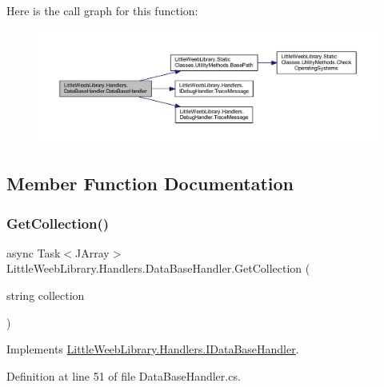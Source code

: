 Here is the call graph for this function\+:\nopagebreak
\begin{figure}[H]
\begin{center}
\leavevmode
\includegraphics[width=350pt]{class_little_weeb_library_1_1_handlers_1_1_data_base_handler_af3623e6075f8aaf6f5082994cd1448df_cgraph}
\end{center}
\end{figure}


\subsection{Member Function Documentation}
\mbox{\label{class_little_weeb_library_1_1_handlers_1_1_data_base_handler_ae04312874502a18b241c1123ef963b90}} 
\subsubsection{\texorpdfstring{Get\+Collection()}{GetCollection()}}
{\footnotesize\ttfamily async Task$<$J\+Array$>$ Little\+Weeb\+Library.\+Handlers.\+Data\+Base\+Handler.\+Get\+Collection (\begin{DoxyParamCaption}\item[{string}]{collection }\end{DoxyParamCaption})}



Implements \mbox{\hyperlink{interface_little_weeb_library_1_1_handlers_1_1_i_data_base_handler_a33ee83202d229f44d3839af7c1b65df0}{Little\+Weeb\+Library.\+Handlers.\+I\+Data\+Base\+Handler}}.



Definition at line 51 of file Data\+Base\+Handler.\+cs.



